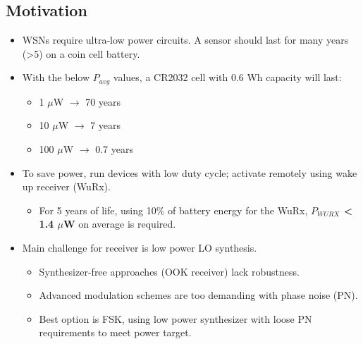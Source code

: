 \documentclass[10pt,a4paper]{article}
\begin{document}
		\subsection{Motivation}
		\begin{itemize}
			\footnotesize
			\item WSNs require ultra-low power circuits. A sensor should last for many years (>5) on a coin cell battery.
			\item With the below $P_{avg}$ values, a CR2032 cell with 0.6 Wh capacity will last:
			\begin{itemize}
				\scriptsize
				\item 1 $\mu$W $\rightarrow$ 70 years
				\item 10 $\mu$W $\rightarrow$ 7 years
				\item 100 $\mu$W $\rightarrow$ 0.7 years
			\end{itemize} 
			\item To save power, run devices with low duty cycle; activate remotely using wake up receiver (WuRx).
			\begin{itemize}
				\scriptsize
				\item For 5 years of life, using 10\% of battery energy for the WuRx, \textbf{$P_{WURX}$ < 1.4 $\mu$W} on average is required.
			\end{itemize} 
			\item Main challenge for receiver is low power LO synthesis.
			\begin{itemize}
				\scriptsize
				\item Synthesizer-free approaches (OOK receiver) lack robustness.
				\item Advanced modulation schemes are too demanding with phase noise (PN).
				\item Best option is FSK, using low power synthesizer with loose PN requirements to meet power target.
			\end{itemize} 
		\end{itemize}  

		\flushleft
\end{document}
